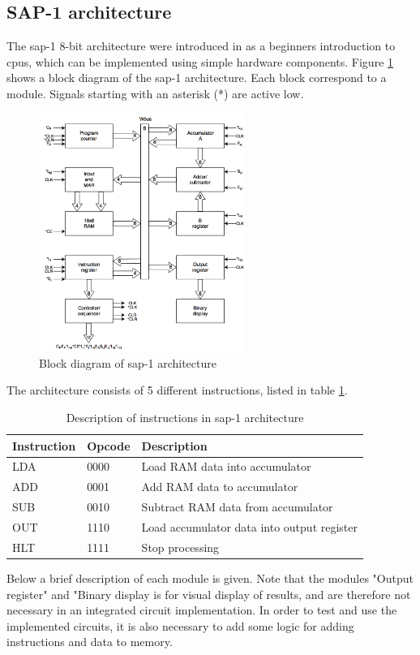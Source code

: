 \subsection{SAP-1 architecture}
The \gls{sap-1} 8-bit architecture were introduced in \cite{malvino1983digital} as a beginners introduction to \gls{cpu}s, which can be implemented using simple hardware components. Figure \ref{fig:sap1arch} shows a block diagram of the \gls{sap-1} architecture. Each block correspond to a module. Signals starting with an asterisk (*) are active low. 
\begin{figure}[hbpt]
\centering
\includegraphics[width=0.6\textwidth]{../figs/SAP1.png}
\caption{\label{fig:sap1arch}Block diagram of \gls{sap-1} architecture}
\end{figure}
The architecture consists of 5 different instructions, listed in table \ref{tab:sap1instr}.

\begin{table}[hbpt]
    \centering
    \caption{\label{tab:sap1instr}Description of instructions in \gls{sap-1} architecture}
    \begin{tabular}{lll}
      \textbf{Instruction} & \textbf{Opcode} & \textbf{Description} \\
      \hline
      LDA & 0000 & Load RAM data into accumulator \\
      \hline
      ADD & 0001 & Add RAM data to accumulator \\
      \hline
      SUB & 0010 & Subtract RAM data from accumulator \\
      \hline
      OUT & 1110 & Load accumulator data into output register \\
      \hline
      HLT & 1111 & Stop processing\\
    \end{tabular}
\end{table}
\noindent
Below a brief description of each module is given. Note that the modules "Output register" and "Binary display is for visual display of results, and are therefore not necessary in an integrated circuit implementation. In order to test and use the implemented circuits, it is also necessary to add some logic for adding instructions and data to memory.

